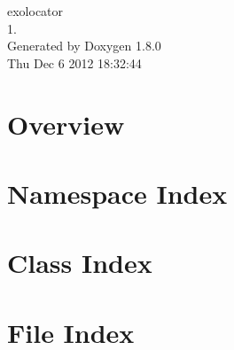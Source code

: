 \documentclass{book}
\begin{document}
\hypersetup{pageanchor=false,citecolor=blue}
\begin{titlepage}
\vspace*{7cm}
\begin{center}
{\Large exolocator \\[1ex]\large 1. }\\
\vspace*{1cm}
{\large Generated by Doxygen 1.8.0}\\
\vspace*{0.5cm}
{\small Thu Dec 6 2012 18:32:44}\\
\end{center}
\end{titlepage}
\clearemptydoublepage
{}
\tableofcontents
\clearemptydoublepage
{}
\hypersetup{pageanchor=true,citecolor=blue}
\chapter{Overview}
\label{index}\hypertarget{index}{}
\chapter{Namespace Index}

\chapter{Class Index}

\chapter{File Index}

\end{document}
